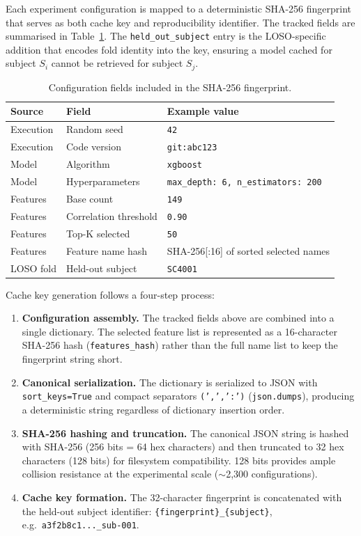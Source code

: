 Each experiment configuration is mapped to a deterministic SHA-256 fingerprint
that serves as both cache key and reproducibility identifier. The tracked
fields are summarised in Table~\ref{tab:fingerprint_fields}. The
\texttt{held\_out\_subject} entry is the LOSO-specific addition that
encodes fold identity into the key, ensuring a model cached for subject
$S_i$ cannot be retrieved for subject $S_j$.

\begin{table}[htbp]
\centering
\caption[Configuration fields in the SHA-256 fingerprint]{Configuration fields included in the SHA-256 fingerprint.}
\label{tab:fingerprint_fields}
\begin{tabular}{lll}
\toprule
\textbf{Source} & \textbf{Field} & \textbf{Example value} \\
\midrule
Execution & Random seed & \texttt{42} \\
Execution & Code version & \texttt{git:abc123} \\
Model & Algorithm & \texttt{xgboost} \\
Model & Hyperparameters & \texttt{max\_depth: 6, n\_estimators: 200} \\
Features & Base count & \texttt{149} \\
Features & Correlation threshold & \texttt{0.90} \\
Features & Top-K selected & \texttt{50} \\
Features & Feature name hash & SHA-256[:16] of sorted selected names \\
LOSO fold & Held-out subject & \texttt{SC4001} \\
\bottomrule
\end{tabular}
\end{table}

Cache key generation follows a four-step process:

\begin{enumerate}
\item \textbf{Configuration assembly.} The tracked fields above are combined
 into a single dictionary. The selected feature list is represented as a
 16-character SHA-256 hash (\texttt{features\_hash}) rather than the
 full name list to keep the fingerprint string short.

\item \textbf{Canonical serialization.} The dictionary is serialized to JSON
 with \texttt{sort\_keys=True} and compact separators \texttt{(',',':')}
 (\texttt{json.dumps}), producing a deterministic string regardless of
 dictionary insertion order.

\item \textbf{SHA-256 hashing and truncation.} The canonical JSON string is
 hashed with SHA-256 (256 bits = 64 hex characters) and then truncated to
 32 hex characters (128 bits) for filesystem compatibility. 128 bits
 provides ample collision resistance at the experimental scale
 ($\sim$2{,}300 configurations).

\item \textbf{Cache key formation.} The 32-character fingerprint is
 concatenated with the held-out subject identifier:
 \texttt{\{fingerprint\}\_\{subject\}}, e.g.\
 \texttt{a3f2b8c1...\_sub-001}.
\end{enumerate}

